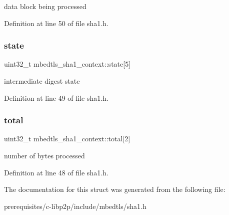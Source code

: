 data block being processed 

Definition at line 50 of file sha1.\+h.

\mbox{\label{structmbedtls__sha1__context_af651fef2b175fced6b05aa196fe1f0c8}} 
\subsubsection{\texorpdfstring{state}{state}}
{\footnotesize\ttfamily uint32\+\_\+t mbedtls\+\_\+sha1\+\_\+context\+::state\mbox{[}5\mbox{]}}

intermediate digest state 

Definition at line 49 of file sha1.\+h.

\mbox{\label{structmbedtls__sha1__context_a19789ddfacc37f47eb34e26ae718997e}} 
\subsubsection{\texorpdfstring{total}{total}}
{\footnotesize\ttfamily uint32\+\_\+t mbedtls\+\_\+sha1\+\_\+context\+::total\mbox{[}2\mbox{]}}

number of bytes processed 

Definition at line 48 of file sha1.\+h.



The documentation for this struct was generated from the following file\+:\begin{DoxyCompactItemize}
\item 
prerequisites/c-\/libp2p/include/mbedtls/sha1.\+h\end{DoxyCompactItemize}
